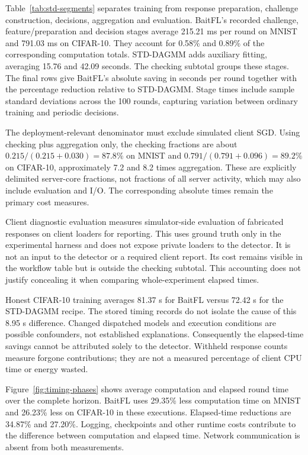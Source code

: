 \documentclass[journal]{IEEEtran}
\begin{document}
Table~\ref{tab:std-segments} separates training from response preparation,
challenge construction, decisions, aggregation and evaluation. BaitFL's
recorded challenge, feature/preparation and decision stages average
215.21 ms per round on MNIST and
791.03 ms on CIFAR-10. They account for 0.58\% and
0.89\% of the corresponding computation totals. STD-DAGMM adds auxiliary
fitting, averaging 15.76 and 42.09 seconds.
The checking subtotal groups these stages. The final rows give BaitFL's
absolute saving in seconds per round together with the percentage
reduction relative to STD-DAGMM. Stage times include sample standard
deviations across the 100 rounds, capturing variation between ordinary
training and periodic decisions.

The deployment-relevant denominator must exclude simulated client SGD.
Using checking plus aggregation only, the checking fractions are about
$0.215/(0.215+0.030)=87.8\%$ on MNIST and
$0.791/(0.791+0.096)=89.2\%$ on CIFAR-10, approximately 7.2 and 8.2 times
aggregation. These are explicitly delimited server-core fractions, not
fractions of all server activity, which may also include evaluation and
I/O. The corresponding absolute times remain the primary cost measures.

Client diagnostic evaluation measures simulator-side evaluation of fabricated
responses on client loaders for reporting. This uses ground truth only in the
experimental harness and does not expose private loaders to the detector.
It is not an input to the detector or a required
client report. Its cost remains visible in the workflow table but is
outside the checking subtotal. This accounting does not justify concealing
it when comparing whole-experiment elapsed times.

Honest CIFAR-10 training averages 81.37 s for BaitFL versus 72.42 s for
the STD-DAGMM recipe. The stored timing records do not isolate the cause
of this 8.95 s difference. Changed dispatched models and execution
conditions are possible confounders, not established explanations.
Consequently the elapsed-time savings cannot be attributed solely to the
detector. Withheld response counts measure forgone contributions; they
are not a measured percentage of client CPU time or energy wasted.

Figure~\ref{fig:timing-phases} shows average
computation and elapsed round time over the complete horizon. BaitFL uses
29.35\% less computation time on MNIST and
26.23\% less on CIFAR-10 in these executions. Elapsed-time
reductions are 34.87\% and
27.20\%. Logging, checkpoints and other runtime costs
contribute to the difference between computation and elapsed time. Network
communication is absent from both measurements.
\end{document}
